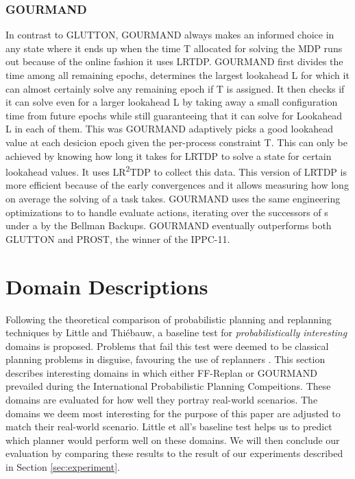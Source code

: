 \documentclass[runningheads,a4paper]{llncs}
\begin{document}
\subsubsection{GOURMAND}
In contrast to GLUTTON, GOURMAND always makes an informed choice in any state where it ends up when the time T allocated for solving the MDP runs out because of the online fashion it uses LRTDP. GOURMAND first divides the time among all remaining epochs, determines the largest lookahead L for which it can almost certainly solve any remaining epoch if T is assigned.  It then checks if it can solve even for a larger lookahead L by taking away a small configuration time from future epochs  while still guaranteeing that it can solve for Lookahead L in each of them. This was GOURMAND adaptively picks a good lookahead value at each desicion epoch given the per-process constraint T. This can only be achieved by knowing how long it takes for LRTDP to solve a state for certain lookahead values. It uses LR\textsuperscript{2}TDP to collect this data. This version of LRTDP is more efficient because of the early convergences and it allows measuring how long on average the solving of a task takes. GOURMAND uses the same engineering optimizations to to handle evaluate actions, iterating over the successors of s under a by the Bellman Backups. GOURMAND eventually outperforms both GLUTTON and PROST, the winner of the IPPC-11\cite{keller2012prost}.



\section{Domain Descriptions}
Following the theoretical comparison of probabilistic planning and replanning techniques by Little and Thi\'ebauw, a baseline test for \emph{probabilistically interesting} domains is proposed. Problems that fail this test were deemed to be classical planning problems in disguise, favouring the use of replanners \cite{little2007probvsreplan}. This section describes interesting domains in which either FF-Replan or GOURMAND prevailed during the International Probabilistic Planning Compeitions. These domains are evaluated for how well they portray real-world scenarios. The domains we deem most interesting for the purpose of this paper are adjusted to match their real-world scenario. Little et all's baseline test helps us to predict which planner would perform well on these domains. We will then conclude our evaluation by comparing these results to the result of our experiments described in Section \ref{sec:experiment}.
\end{document}
